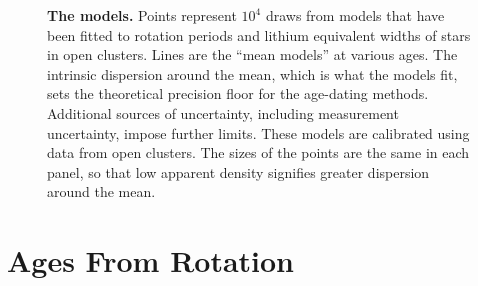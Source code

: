 \documentclass[11pt,twocolumn,tighten]{aastex63}
\begin{document}
\begin{figure}[!t]
	\begin{center}
		\leavevmode
	\end{center}
	\vspace{-0.6cm}
  \caption{{\bf The models.}
    Points represent $10^4$ draws from models that have been fitted to
    rotation periods \citep{Bouma_2023} and lithium equivalent widths
    \citep[EWs;][]{Jeffries_2023} of stars in open clusters.  Lines
    are the ``mean models'' at various ages.  The intrinsic dispersion
    around the mean, which is what the models fit, sets the
    theoretical precision floor for the age-dating methods.
    Additional sources of uncertainty, including measurement
    uncertainty, impose further limits.  These
    models are calibrated using data from open clusters.  The sizes of
    the points are the same in each panel, so that low apparent
    density signifies greater dispersion around the mean.
		\label{fig:models}
	}
\end{figure}


\section{Ages From Rotation}
\label{sec:rotage}
\end{document}
